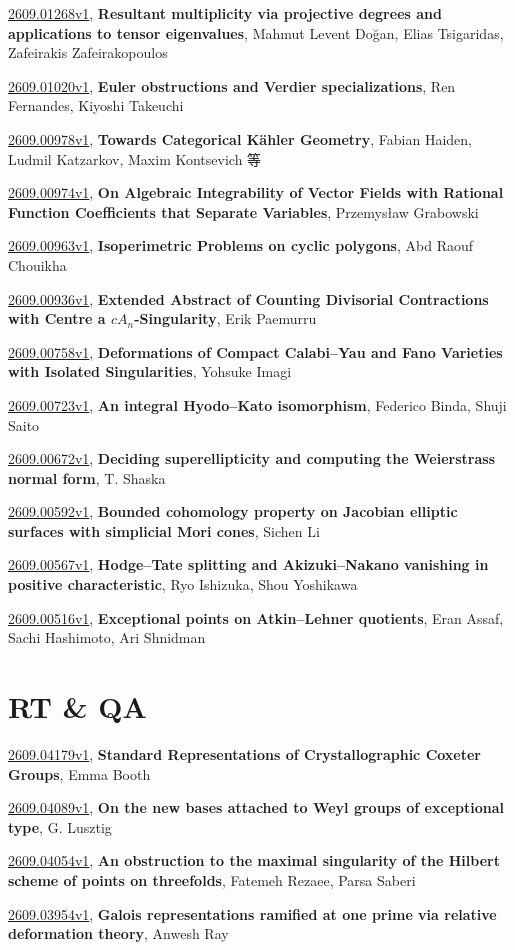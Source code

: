 \documentclass[9pt, a4paper]{article}
\theoremstyle{plain}
\theoremstyle{definition}
\theoremstyle{remark}
\newcommand{\arxiv}[3]{\href{https://arxiv.org/abs/#1}{#1}, \textbf{\textcolor{arxivblue}{#2}}, #3}
\begin{document}
\arxiv{2609.01268v1}{Resultant multiplicity via projective degrees and applications to tensor eigenvalues}{Mahmut Levent Doğan, Elias Tsigaridas, Zafeirakis Zafeirakopoulos}

\arxiv{2609.01020v1}{Euler obstructions and Verdier specializations}{Ren Fernandes, Kiyoshi Takeuchi}

\arxiv{2609.00978v1}{Towards Categorical Kähler Geometry}{Fabian Haiden, Ludmil Katzarkov, Maxim Kontsevich 等}

\arxiv{2609.00974v1}{On Algebraic Integrability of Vector Fields with Rational Function Coefficients that Separate Variables}{Przemysław Grabowski}

\arxiv{2609.00963v1}{Isoperimetric Problems on cyclic polygons}{Abd Raouf Chouikha}

\arxiv{2609.00936v1}{Extended Abstract of Counting Divisorial Contractions with Centre a $cA_n$-Singularity}{Erik Paemurru}

\arxiv{2609.00758v1}{Deformations of Compact Calabi--Yau and Fano Varieties with Isolated Singularities}{Yohsuke Imagi}

\arxiv{2609.00723v1}{An integral Hyodo--Kato isomorphism}{Federico Binda, Shuji Saito}

\arxiv{2609.00672v1}{Deciding superellipticity and computing the Weierstrass normal form}{T. Shaska}

\arxiv{2609.00592v1}{Bounded cohomology property on Jacobian elliptic surfaces with simplicial Mori cones}{Sichen Li}

\arxiv{2609.00567v1}{Hodge--Tate splitting and Akizuki--Nakano vanishing in positive characteristic}{Ryo Ishizuka, Shou Yoshikawa}

\arxiv{2609.00516v1}{Exceptional points on Atkin--Lehner quotients}{Eran Assaf, Sachi Hashimoto, Ari Shnidman}


\section{RT \& QA}
\arxiv{2609.04179v1}{Standard Representations of Crystallographic Coxeter Groups}{Emma Booth}

\arxiv{2609.04089v1}{On the new bases attached to Weyl groups of exceptional type}{G. Lusztig}

\arxiv{2609.04054v1}{An obstruction to the maximal singularity of the Hilbert scheme of points on threefolds}{Fatemeh Rezaee, Parsa Saberi}

\arxiv{2609.03954v1}{Galois representations ramified at one prime via relative deformation theory}{Anwesh Ray}
\end{document}
